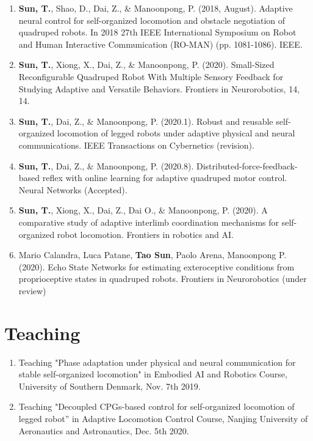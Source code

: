 \documentclass[letterpaper,11pt]{article}
\begin{document}
\begin{enumerate}
\item \textbf{Sun, T.}, Shao, D., Dai, Z., \& Manoonpong, P. (2018, August). Adaptive neural control for self-organized locomotion and obstacle negotiation of quadruped robots. In 2018 27th IEEE International Symposium on Robot and Human Interactive Communication (RO-MAN) (pp. 1081-1086). IEEE.
\item \textbf{Sun, T.}, Xiong, X., Dai, Z., \& Manoonpong, P. (2020). Small-Sized Reconfigurable Quadruped Robot With Multiple Sensory Feedback for Studying Adaptive and Versatile Behaviors. Frontiers in Neurorobotics, 14, 14.
\item \textbf{Sun, T.}, Dai, Z., \& Manoonpong, P. (2020.1). Robust and reusable self-organized locomotion of legged robots under adaptive physical and neural communications. IEEE Transactions on Cybernetics (revision).
\item \textbf{Sun, T.}, Dai, Z., \& Manoonpong, P. (2020.8). Distributed-force-feedback-based reflex with online learning for adaptive quadruped motor control. Neural Networks (Accepted).
\item \textbf{Sun, T.}, Xiong, X., Dai, Z., Dai O., \& Manoonpong, P. (2020). A comparative study of adaptive interlimb coordination mechanisms for self-organized robot locomotion. Frontiers in robotics and AI.
\item Mario Calandra, Luca Patane, \textbf{Tao Sun}, Paolo Arena, Manoonpong P. (2020). Echo State Networks for estimating exteroceptive conditions from proprioceptive states in quadruped robots. Frontiers in Neurorobotics (under review)
\end{enumerate}

\section{Teaching}
\begin{enumerate}
    \item Teaching "Phase adaptation under physical and neural communication for stable self-organized locomotion" in Embodied AI and Robotics Course, University of Southern Denmark, Nov. 7th 2019.
    \item Teaching "Decoupled CPGs-based control for self-organized locomotion of legged robot” in  Adaptive Locomotion Control Course, Nanjing University of Aeronautics and Astronautics, Dec. 5th  2020.
\end{enumerate}
\end{document}
